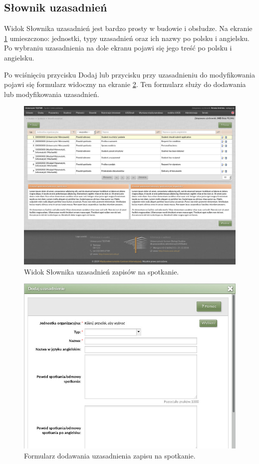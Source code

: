 \documentclass[licencjacka]{pracamgr}
\begin{document}
\subsection{Słownik uzasadnień}
Widok Słownika uzasadnień jest bardzo prosty w budowie i obsłudze. Na ekranie \ref{fig:uzasadnienia} umieszczono: jednostki, typy uzasadnień oraz ich nazwy po polsku i angielsku. Po wybraniu uzasadnienia na dole ekranu pojawi się jego treść po polsku i angielsku.

Po wciśnięciu przycisku \textsf{Dodaj} lub przycisku przy uzasadnieniu do modyfikowania pojawi się formularz widoczny na ekranie \ref{fig:formularz_uzasadnienia}. Ten formularz służy do dodawania lub modyfikowania uzasadnień.

\begin{figure}[!]
  \includegraphics[width=\linewidth]{widok_uzasadnien.jpg}
  \caption{Widok Słownika uzasadnień zapisów na spotkanie.}
  \label{fig:uzasadnienia}
\end{figure}

\begin{figure}[!]
  \includegraphics[width=\linewidth]{formularz_uzasadnien.jpg}
  \caption{Formularz dodawania uzasadnienia zapisu na spotkanie.}
  \label{fig:formularz_uzasadnienia}
\end{figure}
\end{document}
